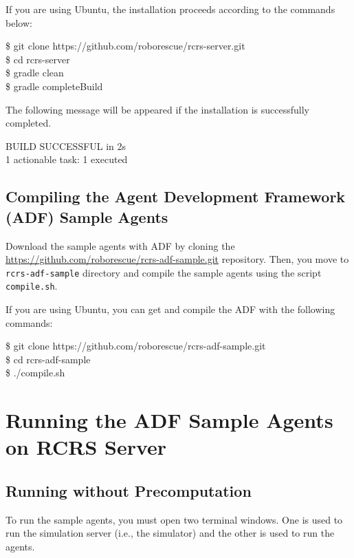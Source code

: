 \documentclass[a4paper]{article}
\begin{document}
If you are using Ubuntu, the installation proceeds according to the commands below:

\begin{center}
  \begin{tcolorbox}[title=Installation on Ubuntu, width=.98\linewidth]
  {\ttfamily\small
  \$ git clone https://github.com/roborescue/rcrs-server.git\\
  \$ cd rcrs-server\\
  \$ gradle clean\\
  \$ gradle completeBuild
  }
  \end{tcolorbox}
\end{center}

The following message will be appeared if the installation is successfully completed.

\begin{center}
  \begin{tcolorbox}[title=Install Completion, width=.98\linewidth]
  {\ttfamily
  BUILD SUCCESSFUL in 2s\\
  1 actionable task: 1 executed
  }
  \end{tcolorbox}
\end{center}
\subsection{Compiling the Agent Development Framework (ADF) Sample Agents}
Download the sample agents with ADF by cloning the \url{https://github.com/roborescue/rcrs-adf-sample.git} repository. Then, you move to \texttt{rcrs-adf-sample} directory and compile the sample agents using the
script \texttt{compile.sh}.

If you are using Ubuntu, you can get and compile the ADF with the following commands:

\begin{center}
  \begin{tcolorbox}[title=Download ADF on Ubuntu, width=.98\linewidth]
  {\ttfamily\small
  \$ git clone https://github.com/roborescue/rcrs-adf-sample.git\\
  \$ cd rcrs-adf-sample\\
  \$ ./compile.sh
  }
  \end{tcolorbox}
\end{center}
\section{Running the ADF Sample Agents on RCRS Server}
\subsection{Running without Precomputation}
To run the sample agents, you must open two terminal windows. One is used to run the simulation server (i.e., the simulator) and the other is used to run the agents.
\end{document}
